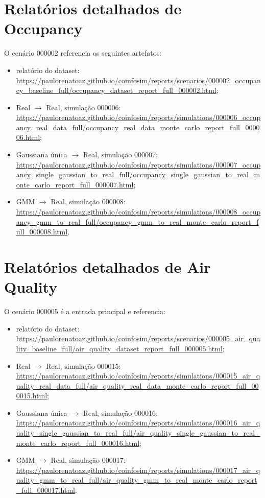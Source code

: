 \section{Relatórios detalhados de Occupancy}

O cenário 000002 referencia os seguintes artefatos:

\begin{itemize}
  \item relatório do dataset: \url{https://paulorenatoaz.github.io/coinfosim/reports/scenarios/000002_occupancy_baseline_full/occupancy_dataset_report_full_000002.html};
  \item Real $\rightarrow$ Real, simulação 000006: \url{https://paulorenatoaz.github.io/coinfosim/reports/simulations/000006_occupancy_real_data_full/occupancy_real_data_monte_carlo_report_full_000006.html};
  \item Gaussiana única $\rightarrow$ Real, simulação 000007: \url{https://paulorenatoaz.github.io/coinfosim/reports/simulations/000007_occupancy_single_gaussian_to_real_full/occupancy_single_gaussian_to_real_monte_carlo_report_full_000007.html};
  \item GMM $\rightarrow$ Real, simulação 000008: \url{https://paulorenatoaz.github.io/coinfosim/reports/simulations/000008_occupancy_gmm_to_real_full/occupancy_gmm_to_real_monte_carlo_report_full_000008.html}.
\end{itemize}

\section{Relatórios detalhados de Air Quality}

O cenário 000005 é a entrada principal e referencia:

\begin{itemize}
  \item relatório do dataset: \url{https://paulorenatoaz.github.io/coinfosim/reports/scenarios/000005_air_quality_baseline_full/air_quality_dataset_report_full_000005.html};
  \item Real $\rightarrow$ Real, simulação 000015: \url{https://paulorenatoaz.github.io/coinfosim/reports/simulations/000015_air_quality_real_data_full/air_quality_real_data_monte_carlo_report_full_000015.html};
  \item Gaussiana única $\rightarrow$ Real, simulação 000016: \url{https://paulorenatoaz.github.io/coinfosim/reports/simulations/000016_air_quality_single_gaussian_to_real_full/air_quality_single_gaussian_to_real_monte_carlo_report_full_000016.html};
  \item GMM $\rightarrow$ Real, simulação 000017: \url{https://paulorenatoaz.github.io/coinfosim/reports/simulations/000017_air_quality_gmm_to_real_full/air_quality_gmm_to_real_monte_carlo_report_full_000017.html}.
\end{itemize}

